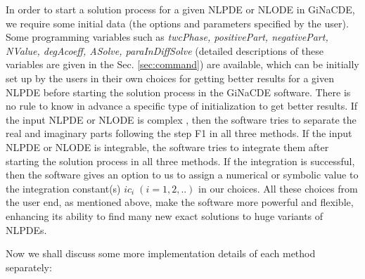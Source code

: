 \documentclass[prd,aps,floats,showkeys,nofootinbib,notitlepage]{revtex4-2}
\begin{document}
	
	In order to start a solution process for a given NLPDE or NLODE in GiNaCDE, we require some initial data (the options and parameters specified by the user). Some programming variables such as \textit{twcPhase, positivePart, negativePart, NValue,  degAcoeff, ASolve, paraInDiffSolve} (detailed descriptions of these variables are given in the Sec. \ref{sec:command}) are available, which can be initially set up by the users in their own choices for getting better results for a given NLPDE before starting the solution process in the GiNaCDE software. There is no rule to know in advance a specific type of initialization to get better results.
	If the input NLPDE or NLODE is complex , then the software tries to separate the real and imaginary parts following the step F1 in all three methods.
	If the input NLPDE or NLODE is integrable, the software tries to integrate them after starting the solution process in all three methods. If the integration is successful, then the software gives an option to us to assign a numerical or symbolic value to the integration constant(s) $ic_i\;(i=1,2,..)$ in our choices. All these choices from the user end, as mentioned above, make the software more powerful and flexible, enhancing its ability to find many new exact solutions to huge variants of NLPDEs.
	
	Now we shall discuss some more implementation details of each method separately:
	
\end{document}
